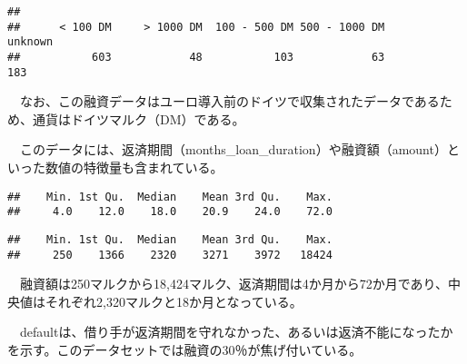 \documentclass[
]{article}
\newenvironment{Shaded}{\begin{snugshade}}{\end{snugshade}}
\newcommand{\FunctionTok}[1]{\textcolor[rgb]{0.13,0.29,0.53}{\textbf{#1}}}
\newcommand{\NormalTok}[1]{#1}
\newcommand{\SpecialCharTok}[1]{\textcolor[rgb]{0.81,0.36,0.00}{\textbf{#1}}}
\begin{document}
\begin{Shaded}
\end{Shaded}

\begin{verbatim}
## 
##      < 100 DM     > 1000 DM  100 - 500 DM 500 - 1000 DM       unknown 
##           603            48           103            63           183
\end{verbatim}

　なお、この融資データはユーロ導入前のドイツで収集されたデータであるため、通貨はドイツマルク（DM）である。

　このデータには、返済期間（months\_loan\_duration）や融資額（amount）といった数値の特徴量も含まれている。

\begin{Shaded}
\end{Shaded}

\begin{verbatim}
##    Min. 1st Qu.  Median    Mean 3rd Qu.    Max. 
##     4.0    12.0    18.0    20.9    24.0    72.0
\end{verbatim}

\begin{Shaded}
\end{Shaded}

\begin{verbatim}
##    Min. 1st Qu.  Median    Mean 3rd Qu.    Max. 
##     250    1366    2320    3271    3972   18424
\end{verbatim}

　融資額は250マルクから18,424マルク、返済期間は4か月から72か月であり、中央値はそれぞれ2,320マルクと18か月となっている。

　defaultは、借り手が返済期間を守れなかった、あるいは返済不能になったかを示す。このデータセットでは融資の30％が焦げ付いている。

\begin{Shaded}
\end{Shaded}
\end{document}
